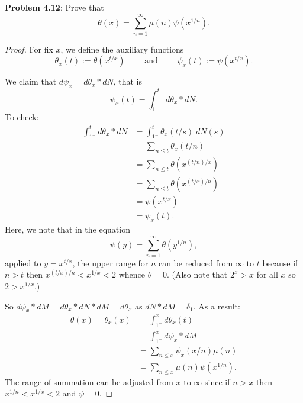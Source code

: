 \documentclass[12pt]{article}
\begin{document}
\fi

\textbf{Problem 4.12}: Prove that
$$\theta(x) = \sum_{n=1}^{\infty} \mu(n) \psi(x^{1/n}).$$

\begin{proof}
For fix $x$, we define the auxiliary functions
$$\theta_x(t) := \theta(x^{t/x}) \qquad \text{ and } \qquad \psi_x(t) := \psi(x^{t/x}).$$

We claim that $d\psi_x = d\theta_x * dN$, that is
$$\psi_x(t) = \int_{1^-}^t d\theta_x * dN.$$
To check:
\begin{align*}
\int_{1^-}^t d\theta_x * dN &= \int_{1^-}^t \theta_x(t/s) \; dN(s)\\
&= \sum_{n \leq t} \theta_x(t/n)\\
&= \sum_{n \leq t} \theta(x^{(t/n)/x})\\
&= \sum_{n \leq t} \theta(x^{(t/x)/n})\\
&= \psi(x^{t/x})\\
&= \psi_x(t).
\end{align*}
Here, we note that in the equation
$$\psi(y) = \sum_{n=1}^{\infty} \theta(y^{1/n}),$$
applied to $y = x^{t/x}$, the upper range for $n$ can be reduced from $\infty$ to $t$ because if $n > t$ then $x^{(t/x)/n} < x^{1/x} < 2$ whence $\theta = 0$. (Also note that $2^x > x$ for all $x$ so $2 > x^{1/x}$.)

So $d\psi_x * dM = d\theta_x * dN * dM = d\theta_x$ as $dN * dM = \delta_1$. As a result:
\begin{align*}
\theta(x) = \theta_x(x) &= \int_{1^-}^{x} d\theta_x(t)\\
&= \int_{1^-}^{x} d\psi_x * dM\\
&= \sum_{n \leq x} \psi_x(x/n) \mu(n)\\
&= \sum_{n \leq x} \mu(n) \psi(x^{1/n}).
\end{align*}
The range of summation can be adjusted from $x$ to $\infty$ since if $n > x$ then $x^{1/n} < x^{1/x} < 2$ and $\psi = 0$.
\end{proof}

\unless\ifdefined\IsMainDocument
\end{document}
